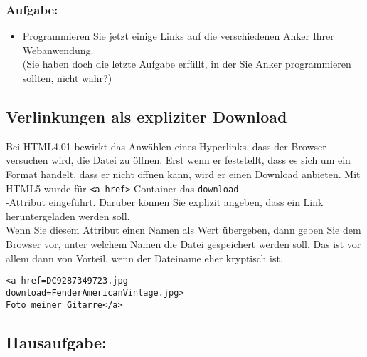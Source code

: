 \subsubsection{Aufgabe:}

\begin{itemize}
	\item Programmieren Sie jetzt einige Links auf die verschiedenen Anker Ihrer Webanwendung.\\
	
	(Sie haben doch die letzte Aufgabe erfüllt, in der Sie Anker programmieren sollten, nicht wahr?)
\end{itemize}

\subsection{Verlinkungen als expliziter Download}

Bei HTML4.01 bewirkt das Anwählen eines Hyperlinks, dass der Browser versuchen wird, die Datei zu öffnen. Erst wenn er feststellt, dass es sich um ein Format handelt, dass er nicht öffnen kann, wird er einen Download anbieten. Mit HTML5 wurde für \verb|<a href>|-Container das \verb|download|\\-Attribut eingeführt. Darüber können Sie explizit angeben, dass ein Link heruntergeladen werden soll.\\

Wenn Sie diesem Attribut einen Namen als Wert übergeben, dann geben Sie dem Browser vor, unter welchem Namen die Datei gespeichert werden soll. Das ist vor allem dann von Vorteil, wenn der Dateiname eher kryptisch ist.

\begin{verbatim}
<a href=DC9287349723.jpg 
download=FenderAmericanVintage.jpg>
Foto meiner Gitarre</a>
\end{verbatim}

\subsection{Hausaufgabe:}

